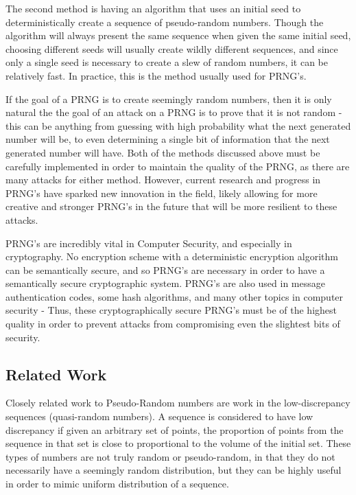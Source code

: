 \documentclass[11pt]{article}
\begin{document}
The second method is having an algorithm that uses an initial seed to deterministically create a sequence of pseudo-random numbers. Though the algorithm will always present the same sequence when given the same initial seed, choosing different seeds will usually create wildly different sequences, and since only a single seed is necessary to create a slew of random numbers, it can be relatively fast. In practice, this is the method usually used for PRNG's.

If the goal of a PRNG is to create seemingly random numbers, then it is only natural the the goal of an attack on a PRNG is to prove that it is not random - this can be anything from guessing with high probability what the next generated number will be, to even determining a single bit of information that the next generated number will have. Both of the methods discussed above must be carefully implemented in order to maintain the quality of the PRNG, as there are many attacks for either method. However, current research and progress in PRNG's have sparked new innovation in the field, likely allowing for more creative and stronger PRNG's in the future that will be more resilient to these attacks. 

PRNG's are incredibly vital in Computer Security, and especially in cryptography. No encryption scheme with a deterministic encryption algorithm can be semantically secure, and so PRNG's are necessary in order to have a semantically secure cryptographic system. PRNG's are also used in message authentication codes, some hash algorithms, and many other topics in computer security - Thus, these cryptographically secure PRNG's must be of the highest quality in order to prevent attacks from compromising even the slightest bits of security. 


\subsection{Related Work}

Closely related work to Pseudo-Random numbers are work in the low-discrepancy sequences (quasi-random numbers). A sequence is considered to have low discrepancy if given an arbitrary set of points, the proportion of points from the sequence in that set is close to proportional to the volume of the initial set. These types of numbers are not truly random or pseudo-random, in that they do not necessarily have a seemingly random distribution, but they can be highly useful in order to mimic uniform distribution of a sequence. 
\end{document}
